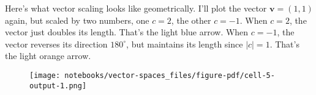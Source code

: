 \documentclass[
  letterpaper,
  DIV=11,
  numbers=noendperiod]{scrreprt}
\newenvironment{Shaded}{\begin{snugshade}}{\end{snugshade}}
\newcommand{\DecValTok}[1]{\textcolor[rgb]{0.68,0.00,0.00}{#1}}
\newcommand{\FloatTok}[1]{\textcolor[rgb]{0.68,0.00,0.00}{#1}}
\newcommand{\NormalTok}[1]{\textcolor[rgb]{0.00,0.23,0.31}{#1}}
\newcommand{\OperatorTok}[1]{\textcolor[rgb]{0.37,0.37,0.37}{#1}}
\newcommand{\SpecialCharTok}[1]{\textcolor[rgb]{0.37,0.37,0.37}{#1}}
\newcommand{\SpecialStringTok}[1]{\textcolor[rgb]{0.13,0.47,0.30}{#1}}
\newcommand{\StringTok}[1]{\textcolor[rgb]{0.13,0.47,0.30}{#1}}
\begin{document}
Here's what vector scaling looks like geometrically. I'll plot the
vector \(\mathbf{v}=(1,1)\) again, but scaled by two numbers, one
\(c=2\), the other \(c=-1\). When \(c=2\), the vector just doubles its
length. That's the light blue arrow. When \(c=-1\), the vector reverses
its direction \(180^\circ\), but maintains its length since \(|c|=1\).
That's the light orange arrow.

\begin{Shaded}
\end{Shaded}

\begin{figure}[H]

{\centering \texttt{[image: notebooks/vector-spaces\_files/figure-pdf/cell-5-output-1.png]}

}

\end{figure}
\end{document}
